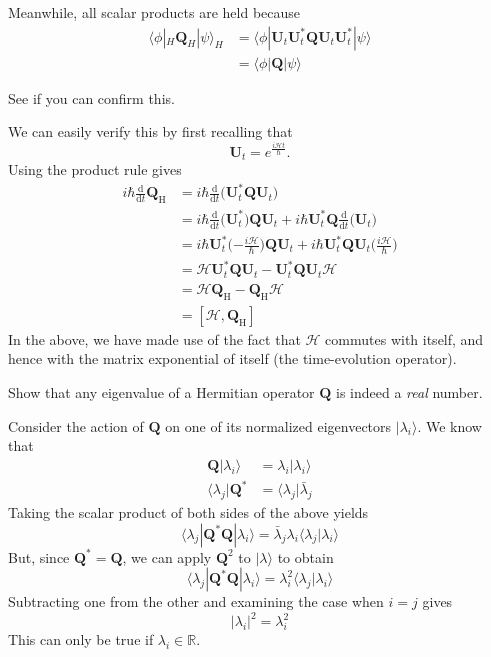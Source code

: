 \documentclass[../road-to-reality.tex]{subfiles}
\begin{document}
\begin{questions}
\begin{solution}
	Meanwhile, all scalar products are held because
	\begin{align*}
		\langle\phi|_H\mathbf{Q}_H|\psi\rangle_H &= \langle\phi|\mathbf{U}_t\mathbf{U}_t^*\mathbf{Q}\mathbf{U}_t\mathbf{U}_t^*|\psi\rangle \\
		&= \langle\phi|\mathbf{Q}|\psi\rangle
	\end{align*}
\end{solution}

\question See if you can confirm this.

\begin{solution}
	We can easily verify this by first recalling that
	\[
		\mathbf{U}_t = e^{\frac{i\mathcal{H}t}{\hbar}}.
	\]
	Using the product rule gives
	\begin{align*}
		i\hbar\frac{\mathrm{d}}{\mathrm{d}t}\mathbf{Q}_{\mathrm{H}} &= i\hbar\frac{\mathrm{d}}{\mathrm{d}t}\Big(\mathbf{U}_t^*\mathbf{Q}\mathbf{U}_t\Big) \\
		&= i\hbar\frac{\mathrm{d}}{\mathrm{d}t}\Big(\mathbf{U}_t^*\Big)\mathbf{Q}\mathbf{U}_t + i\hbar\mathbf{U}_t^*\mathbf{Q}\frac{\mathrm{d}}{\mathrm{d}t}\Big(\mathbf{U}_t\Big) \\
		&= i\hbar\mathbf{U}_t^*\Big({-\frac{i\mathcal{H}}{\hbar}}\Big)\mathbf{Q}\mathbf{U}_t + i\hbar\mathbf{U}_t^*\mathbf{Q}\mathbf{U}_t\Big({\frac{i\mathcal{H}}{\hbar}}\Big) \\
		&= \mathcal{H}\mathbf{U}_t^*\mathbf{Q}\mathbf{U}_t - \mathbf{U}_t^*\mathbf{Q}\mathbf{U}_t\mathcal{H} \\
		&= \mathcal{H}\mathbf{Q}_{\mathrm{H}} - \mathbf{Q}_{\mathrm{H}}\mathcal{H} \\
		&= [\mathcal{H}, \mathbf{Q}_{\mathrm{H}}]
	\end{align*}
	In the above, we have made use of the fact that $\mathcal{H}$ commutes with itself, and hence with the matrix exponential of itself (the time-evolution operator).
\end{solution}

\question Show that any eigenvalue of a Hermitian operator $\mathbf{Q}$ is indeed a \textit{real} number.

\begin{solution}
	Consider the action of $\mathbf{Q}$ on one of its normalized eigenvectors $|\lambda_i\rangle$. We know that
	\begin{align*}
		\mathbf{Q}|\lambda_i\rangle &= \lambda_i|\lambda_i\rangle \\
		\langle\lambda_j|\mathbf{Q}^* &= \langle\lambda_j|\bar{\lambda}_j
	\end{align*}
	Taking the scalar product of both sides of the above yields
	\[
		\langle\lambda_j|\mathbf{Q}^*\mathbf{Q}|\lambda_i\rangle = \bar{\lambda}_j\lambda_i\langle\lambda_j|\lambda_i\rangle
	\]
	But, since $\mathbf{Q}^*=\mathbf{Q}$, we can apply $\mathbf{Q}^2$ to $|\lambda\rangle$ to obtain
	\[
		\langle\lambda_j|\mathbf{Q}^*\mathbf{Q}|\lambda_i\rangle = \lambda_i^2\langle\lambda_j|\lambda_i\rangle
	\]
	Subtracting one from the other and examining the case when $i=j$ gives
	\[
		|\lambda_i|^2 = \lambda_i^2
	\]
	This can only be true if $\lambda_i\in\mathbb{R}$.
\end{solution}


\end{questions}
\end{document}
